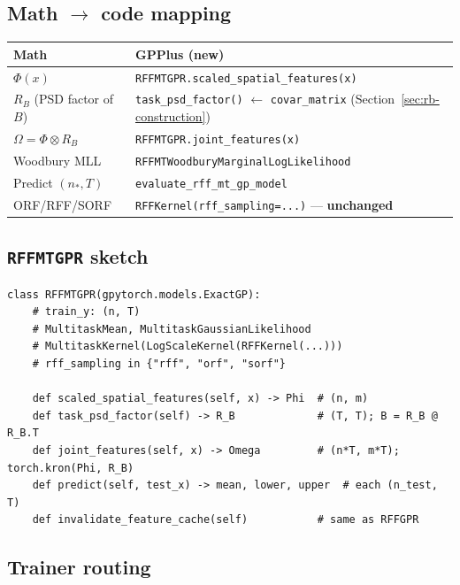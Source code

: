 \documentclass[11pt]{article}
\theoremstyle{plain}
\newcommand{\Ph}{\Phi}
\newcommand{\Om}{\Omega}
\newcommand{\RB}{R_B}
\begin{document}
\subsection{Math $\to$ code mapping}

\begin{center}
\renewcommand{\arraystretch}{1.2}
\begin{tabular}{@{}ll@{}}
\toprule
\textbf{Math} & \textbf{GPPlus (new)} \\
\midrule
$\Ph(x)$ & \texttt{RFFMTGPR.scaled\_spatial\_features(x)} \\
$\RB$ (PSD factor of $B$) & \texttt{task\_psd\_factor()} $\leftarrow$ \texttt{covar\_matrix} (Section~\ref{sec:rb-construction}) \\
$\Om = \Ph \otimes \RB$ & \texttt{RFFMTGPR.joint\_features(x)} \\
Woodbury MLL & \texttt{RFFMTWoodburyMarginalLogLikelihood} \\
Predict $(n_\ast, T)$ & \texttt{evaluate\_rff\_mt\_gp\_model} \\
ORF/RFF/SORF & \texttt{RFFKernel(rff\_sampling=...)} --- \textbf{unchanged} \\
\bottomrule
\end{tabular}
\end{center}

\subsection{\texttt{RFFMTGPR} sketch}

\begin{planbox}
\begin{verbatim}
class RFFMTGPR(gpytorch.models.ExactGP):
    # train_y: (n, T)
    # MultitaskMean, MultitaskGaussianLikelihood
    # MultitaskKernel(LogScaleKernel(RFFKernel(...)))
    # rff_sampling in {"rff", "orf", "sorf"}

    def scaled_spatial_features(self, x) -> Phi  # (n, m)
    def task_psd_factor(self) -> R_B             # (T, T); B = R_B @ R_B.T
    def joint_features(self, x) -> Omega         # (n*T, m*T); torch.kron(Phi, R_B)
    def predict(self, test_x) -> mean, lower, upper  # each (n_test, T)
    def invalidate_feature_cache(self)           # same as RFFGPR
\end{verbatim}
\end{planbox}

\subsection{Trainer routing}
\end{document}
